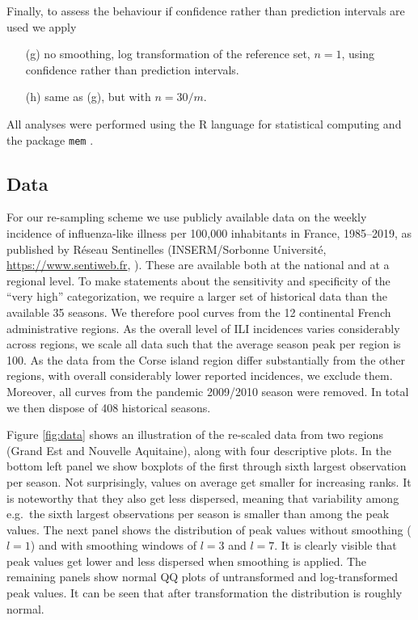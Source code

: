 \documentclass{article}
\begin{document}
Finally, to assess the behaviour if confidence rather than prediction intervals are used we apply
\begin{enumerate}
\item[(g)] no smoothing, log transformation of the reference set, $n = 1$, using confidence rather than prediction intervals.
\item[(h)] same as (g), but with $n = 30/m$.
\end{enumerate}
All analyses were performed using the R language for statistical computing \citep{RCT2020} and the package \texttt{mem} \citep{Lozano2020}.

\subsection{Data}
\label{subsec:data}

For our re-sampling scheme we use publicly available data on the weekly incidence of influenza-like illness per 100,000 inhabitants in France, 1985--2019, as published by Réseau Sentinelles (INSERM/Sorbonne Université, \url{https://www.sentiweb.fr}, \citealt{Flahault2006}). These are available both at the national and at a regional level. To make statements about the sensitivity and specificity of the ``very high'' categorization, we require a larger set of historical data than the available 35 seasons. We therefore pool curves from the 12 continental French administrative regions. As the overall level of ILI incidences varies considerably across regions, we scale all data such that the average season peak per region is 100. As the data from the Corse island region differ substantially from the other regions, with overall considerably lower reported incidences, we exclude them. Moreover, all curves from the pandemic 2009/2010 season were removed. In total we then dispose of 408 historical seasons.

Figure \ref{fig:data} shows an illustration of the re-scaled data from two regions (Grand Est and Nouvelle Aquitaine), along with four descriptive plots. In the bottom left panel we show boxplots of the first through sixth largest observation per season. Not surprisingly, values on average get smaller for increasing ranks. It is noteworthy that they also get less dispersed, meaning that variability among e.g.\ the sixth largest observations per season is smaller than among the peak values. The next panel shows the distribution of peak values without smoothing ($l = 1$) and with smoothing windows of $l = 3$ and $l = 7$. It is clearly visible that peak values get lower and less dispersed when smoothing is applied. The remaining panels show normal QQ plots of untransformed and log-transformed peak values. It can be seen that after transformation the distribution is roughly normal.
\end{document}
